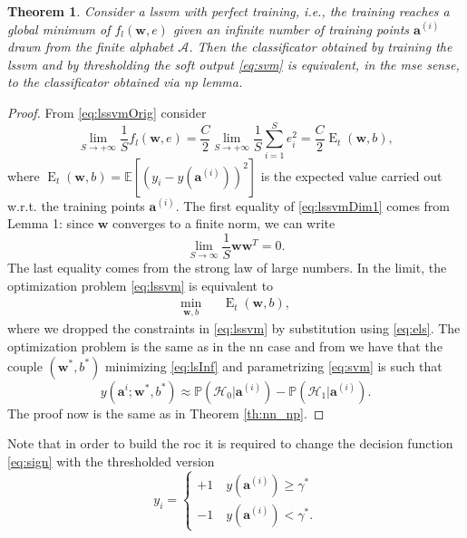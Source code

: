 \documentclass[draftcls,onecolumn,12pt]{IEEEtran}
\newcommand{\ie}{i.e., }
\newcommand{\wrt}{w.r.t. }
\newcommand{\Exp}[1]{\mathbb{E}\left[#1\right]}
\DeclareMathOperator{\E}{E}
\newtheorem{theorem}{Theorem}
\begin{document}
\begin{theorem}
	\label{th:lsnp}
	Consider a \ac{lssvm} with perfect training, \ie the training reaches a global minimum of $f_l(\mathbf{w},e)$ given an infinite number of training points $\bm{a}^{(i)}$ drawn from the finite alphabet $\mathcal A$. Then the classificator obtained by training the \ac{lssvm} and by thresholding the soft output \eqref{eq:svm} is equivalent, in the \ac{mse} sense, to the classificator obtained via \ac{np} lemma.
\end{theorem}
\begin{proof}
	From \eqref{eq:lssvmOrig} consider
	\begin{equation}
	\label{eq:lssvmDim1}
	\lim_{S \to +\infty} \frac{1}{S} f_l(\mathbf{w},e) =\frac{C}{2} \lim_{S \to +\infty}\frac{1}{S}  \sum_{i=1}^S e^2_i	=\frac{C}{2}\E_t(\mathbf{w},b),
	\end{equation}
	where $\E_t(\mathbf{w},b) = \Exp{\left(y_i - y(\mathbf{a}^{(i)})\right)^2} $ is the expected value carried out \wrt the training points $\mathbf{a}^{(i)}$. 
	The first equality of \eqref{eq:lssvmDim1} comes from Lemma 1: since $\mathbf{w}$ converges to a finite norm, we can write
	\begin{equation}
	\lim_{S\to \infty} \frac{1}{S} \mathbf{w} \mathbf{w}^T 	= 0.
	\end{equation} 
	The last equality comes from the strong law of large numbers. In the limit, the optimization problem \eqref{eq:lssvm} is equivalent to
	\begin{equation}
	\label{eq:lsInf}
	\begin{aligned}
	& \underset{\mathbf{w},b}{\text{min}} & &  \E_t(\mathbf{w},b), & 
	\end{aligned}	
	\end{equation}
	where we dropped the constraints in \eqref{eq:lssvm} by substitution using \eqref{eq:els}. The optimization problem is the same as in the \ac{nn} case and from \cite{Ruck-90} we have that the couple $(\mathbf{w}^*,b^*)$ minimizing \eqref{eq:lsInf} and parametrizing \eqref{eq:svm} is such that
	\begin{equation}
	y(\mathbf{a}^i;\mathbf{w}^*,b^*)  \approx \mathbb{P}(\mathcal{H}_0|\mathbf{a}^{(i)}) - \mathbb{P}(\mathcal{H}_1|\mathbf{a}^{(i)}).
	\end{equation}
	The proof now is the same as in Theorem \ref{th:nn_np}.
\end{proof}
Note that in order to build the \ac{roc} it is required to change the decision function \eqref{eq:sign} with the thresholded version
\begin{equation}
y_i = 
\begin{cases}
+1 \quad y(\mathbf{a}^{(i)})  \geq \gamma^* \\
-1 \quad y(\mathbf{a}^{(i)})  < \gamma^*.
\end{cases}		
\end{equation}
\end{document}
